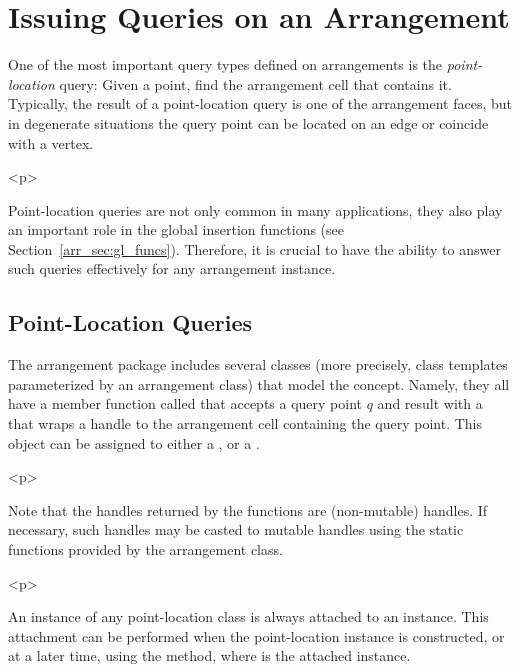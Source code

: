 \section{Issuing Queries on an Arrangement}
\label{arr_sec:queries}
%
One of the most important query types defined on arrangements is
the {\em point-location} query: Given a point, find the
arrangement cell that contains it. Typically, the result of a
point-location query is one of the arrangement faces, but in
degenerate situations the query point can be located on an edge or
coincide with a vertex.

\begin{ccHtmlOnly}<p>\end{ccHtmlOnly}
Point-location queries are not only common in many applications,
they also play an important role in the global insertion functions
(see Section~\ref{arr_sec:gl_funcs}). Therefore, it is crucial to
have the ability to answer such queries effectively for any
arrangement instance.

\subsection{Point-Location Queries}
\label{arr_ssec:pl}
%
The arrangement package includes several classes (more precisely,
class templates parameterized by an arrangement class) that model
the  concept. Namely, they all
have a member function called  that accepts a query
point $q$ and result with a \cgal\  that wraps a handle
to the arrangement cell containing the query point. This object can
be assigned to either a ,
 or a .

\begin{ccHtmlOnly}<p>\end{ccHtmlOnly}
Note that the handles returned by the  functions are
 (non-mutable) handles. If necessary, such handles may
be casted to mutable handles using the static functions
 provided by the
arrangement class.

\begin{ccHtmlOnly}<p>\end{ccHtmlOnly}
An instance of any point-location class is always attached to an
 instance. This attachment can be performed
when the point-location instance is constructed, or at a later
time, using the  method, where  is the
attached  instance.

